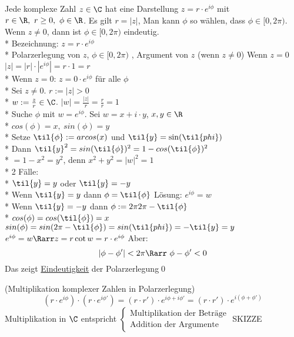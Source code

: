 Jede komplexe Zahl $z \in \C$ hat eine Darstellung $z = r \cdot e^{i\phi}$ mit $r \in \R,\ r \geq 0,\ \phi \in \R$. Es gilt $r= |z|$, Man kann $\phi$ so wählen, dass $\phi \in [0, 2\pi)$. Wenn $z \neq 0$, dann ist $\phi \in [0, 2\pi)$ eindeutig.\\*
Bezeichnung: $z = r \cdot e^{i\phi}$\\*
Polarzerlegung von $z$, $\phi \in [0, 2\pi)$ , Argument von $z$ (wenn $z \neq 0$)
\bew
Wenn $z = 0$ \Rarr{} $|z| = |r| \cdot |e^{i\phi}| = r \cdot 1 = r$\\*
Wenn $z = 0$: $z = 0 \cdot e^{i \phi}$ für alle $\phi$\\*
Sei $z \neq 0$. $r := |z| > 0$\\*
$w:= \frac{z}{r} \in \C$. $|w| = \frac{|z|}{r} = \frac{r}{r} = 1$\\*
Suche $\phi$ mit $w = e^{i \phi}$. Sei $w = x + i \cdot y$, $x,y \in \R$\\*
$cos(\phi) = x,\ sin(\phi) = y$\\*
Setze $\til{\phi} := arcos(x)$ und $\til{y} = \sin(\til{phi})$\\*
Dann $\til{y}^2 = sin(\til{\phi})^2 = 1 - cos(\til{\phi})^2$\\*
$= 1 - x^2 =  y^2$, denn $x^2 + y^2 = |w|^2 = 1$\\*
2 Fälle:\\*
$\til{y} = y$ oder $\til{y} = -y$\\*
Wenn $\til{y} = y$ dann $\phi = \til{\phi}$ Lösung: $e^{i\phi} = w$\\*
Wenn $\til{y} = -y$ dann $\phi := 2\pi 2\pi - \til{\phi}$\\*
$cos(\phi) = cos(\til{\phi}) = x$ \ok\\
$sin(\phi) = sin(2\pi - \til{\phi}) = sin(\til{phi}) = -\til{y} = y$ \ok\\
\Rarr{} $e^{i\phi} = w \Rarr z = r \cot w = r \cdot e^{i\phi}$
Aber:
$$|\phi-\phi'| < 2 \pi \Rarr\ \phi-\phi'<0$$
Das zeigt \ul{Eindeutigkeit} der Polarzerlegung\qed

\bem
(Multiplikation komplexer Zahlen in Polarzerlegung)
$$(r·e^{i\phi})·(r·e^{i\phi'})=(r·r')·e^{i\phi+i\phi'}=(r·r')·e^{i(\phi+\phi')}$$
Multiplikation in $\C$ entspricht $\begin{cases}\text{Multiplikation der Beträge}\\ \text{Addition der Argumente}\end{cases}$ SKIZZE

